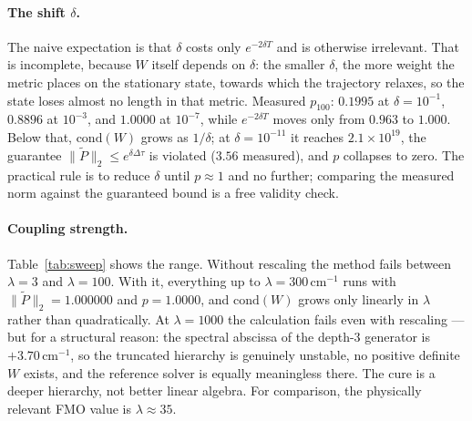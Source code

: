 \documentclass[aps,prx,twocolumn,superscriptaddress,nofootinbib,longbibliography]{revtex4-2}
\theoremstyle{plain}
\newcommand{\norm}[1]{\lVert#1\rVert}
\begin{document}
\paragraph{The shift $\delta$.}
The naive expectation is that $\delta$ costs only $e^{-2\delta T}$ and is
otherwise irrelevant.  That is incomplete, because $W$ itself depends on
$\delta$: the smaller $\delta$, the more weight the metric places on the
stationary state, towards which the trajectory relaxes, so the state loses
almost no length in that metric.  Measured $p_{100}$: $0.1995$ at $\delta=10^{-1}$,
$0.8896$ at $10^{-3}$, and $1.0000$ at $10^{-7}$, while $e^{-2\delta T}$ moves
only from $0.963$ to $1.000$.  Below that, $\mathrm{cond}(W)$ grows as
$1/\delta$; at $\delta=10^{-11}$ it reaches $2.1\times10^{19}$, the guarantee
$\norm{\tilde P}_2\le e^{\delta\Delta\tau}$ is violated ($3.56$ measured), and
$p$ collapses to zero.  The practical rule is to reduce $\delta$ until $p\approx1$
and no further; comparing the measured norm against the guaranteed bound is a
free validity check.

\paragraph{Coupling strength.}
Table~\ref{tab:sweep} shows the range.  Without rescaling the method fails
between $\lambda=3$ and $\lambda=100$.  With it, everything up to
$\lambda=300\,\mathrm{cm}^{-1}$ runs with $\norm{\tilde P}_2=1.000000$ and
$p=1.0000$, and $\mathrm{cond}(W)$ grows only linearly in $\lambda$ rather than
quadratically.  At $\lambda=1000$ the calculation fails even with rescaling ---
but for a structural reason: the spectral abscissa of the depth-$3$ generator is
$+3.70\,\mathrm{cm}^{-1}$, so the truncated hierarchy is genuinely unstable, no
positive definite $W$ exists, and the reference solver is equally meaningless
there.  The cure is a deeper hierarchy, not better linear algebra.  For
comparison, the physically relevant FMO value is $\lambda\approx35$.
\end{document}
